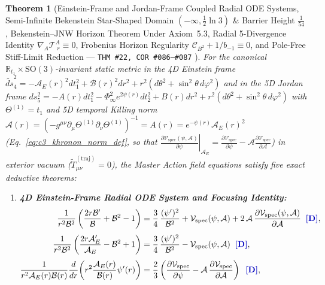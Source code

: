 \documentclass[11pt,a4paper]{article}
\newcommand{\catD}{\text{\textbf{\textcolor{blue!75!black}{[D]}}}}
\theoremstyle{definition}
\theoremstyle{plain}
\newtheorem{theorem}[axiom]{Theorem}
\theoremstyle{remark}
\begin{document}
\begin{theorem}[{Einstein-Frame and Jordan-Frame Coupled Radial ODE Systems, Semi-Infinite Bekenstein Star-Shaped Domain $(-\infty, \frac{1}{2}\ln 3)$ \& Barrier Height $\frac{1}{54}$, Bekenstein--JNW Horizon Theorem Under Axiom~5.3, Radial 5-Divergence Identity $\nabla_A\mathcal{T}^A_{\;r} \equiv 0$, Frobenius Horizon Regularity $\mathcal{C}_{B^2} + 1/b_{-1} \equiv 0$, and Pole-Free Stiff-Limit Reduction --- \texttt{THM~\#22, COR~\#086--\#087} \catD}]\label{thm:c5_static_radial_odes}
For the canonical $\mathbb{R}_{t_1} \times \mathrm{SO}(3)$-invariant static metric in the 4D Einstein frame $\widetilde{ds}_4^2 = -\mathcal{A}_E(r)^2 dt_1^2 + \mathcal{B}(r)^2 dr^2 + r^2(d\theta^2 + \sin^2\theta\,d\varphi^2)$ and in the 5D Jordan frame $ds_5^2 = -A(r)dt_1^2 - \Phi_\infty^2 e^{2\psi(r)}dt_2^2 + B(r)dr^2 + r^2(d\theta^2 + \sin^2\theta\,d\varphi^2)$ with $\Theta^{(1)} = t_1$ and 5D temporal Killing norm $\mathcal{A}(r) = (-g^{\mu\nu}\partial_\mu\Theta^{(1)}\partial_\nu\Theta^{(1)})^{-1} = A(r) = e^{-\psi(r)}\mathcal{A}_E(r)^{2}$ (Eq.~\ref{eq:c3_khronon_norm_def}, so that $\left.\frac{\partial\mathcal{V}_{\mathrm{spec}}(\psi,\mathcal{A})}{\partial\psi}\right|_{\mathcal{A}_E} = \frac{\partial\mathcal{V}_{\mathrm{spec}}}{\partial\psi} - \mathcal{A}\frac{\partial\mathcal{V}_{\mathrm{spec}}}{\partial\mathcal{A}}$) in exterior vacuum ($\tilde{T}_{\mu\nu}^{(\mathrm{traj})} = 0$), the Master Action field equations satisfy five exact deductive theorems:
\begin{enumerate}[label=(\alph*)]
  \item \textbf{4D Einstein-Frame Radial ODE System and Focusing Identity:}
  \begin{align}
  \frac{1}{r^2\mathcal{B}^2}\left(\frac{2r\mathcal{B}'}{\mathcal{B}} + \mathcal{B}^2 - 1\right) &= \frac{3}{4}\,\frac{(\psi')^2}{\mathcal{B}^2} + \mathcal{V}_{\mathrm{spec}}(\psi, \mathcal{A}) + 2\,\mathcal{A}\,\frac{\partial\mathcal{V}_{\mathrm{spec}}(\psi, \mathcal{A})}{\partial\mathcal{A}} \;\;\catD, \label{eq:c5_einstein_radial_11} \\[3pt]
  \frac{1}{r^2\mathcal{B}^2}\left(\frac{2r\mathcal{A}_E'}{\mathcal{A}_E} - \mathcal{B}^2 + 1\right) &= \frac{3}{4}\,\frac{(\psi')^2}{\mathcal{B}^2} - \mathcal{V}_{\mathrm{spec}}(\psi, \mathcal{A}) \;\;\catD, \label{eq:c5_einstein_radial_rr} \\[3pt]
  \frac{1}{r^2\mathcal{A}_E(r)\mathcal{B}(r)}\frac{d}{dr}\!\left(r^2\frac{\mathcal{A}_E(r)}{\mathcal{B}(r)}\psi'(r)\right) &= \frac{2}{3}\left(\frac{\partial\mathcal{V}_{\mathrm{spec}}}{\partial\psi} - \mathcal{A}\,\frac{\partial\mathcal{V}_{\mathrm{spec}}}{\partial\mathcal{A}}\right) \;\;\catD, \label{eq:c5_einstein_radial_psi} \\[3pt]

\end{align}
\end{enumerate}
\end{theorem}
\end{document}
